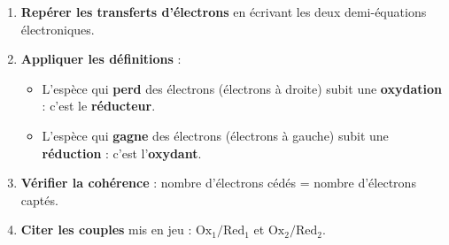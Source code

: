 \documentclass[11pt]{article}
\begin{document}
\begin{methode}
\begin{enumerate}
\item \textbf{Repérer les transferts d'électrons} en écrivant les deux demi-équations électroniques.
\item \textbf{Appliquer les définitions} :
      \begin{itemize}
      \item L'espèce qui \textbf{perd} des électrons (électrons à droite) subit une \textbf{oxydation} : c'est le \textbf{réducteur}.
      \item L'espèce qui \textbf{gagne} des électrons (électrons à gauche) subit une \textbf{réduction} : c'est l'\textbf{oxydant}.
      \end{itemize}
\item \textbf{Vérifier la cohérence} : nombre d'électrons cédés = nombre d'électrons captés.
\item \textbf{Citer les couples} mis en jeu : $\text{Ox}_1/\text{Red}_1$ et $\text{Ox}_2/\text{Red}_2$.
\end{enumerate}
\end{methode}
\end{document}
